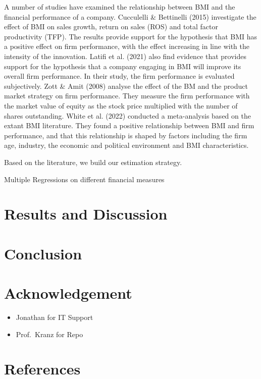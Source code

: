 \documentclass[
]{article}
\providecommand{\tightlist}{%
  \setlength{\itemsep}{0pt}\setlength{\parskip}{0pt}}\usepackage{longtable,booktabs,array}
\begin{document}
A number of studies have examined the relationship between BMI and the
financial performance of a company. Cucculelli \& Bettinelli (2015)
investigate the effect of BMI on sales growth, return on sales (ROS) and
total factor productivity (TFP). The results provide support for the
hypothesis that BMI has a positive effect on firm performance, with the
effect increasing in line with the intensity of the innovation. Latifi
et al. (2021) also find evidence that provides support for the
hypothesis that a company engaging in BMI will improve its overall firm
performance. In their study, the firm performance is evaluated
subjectively. Zott \& Amit (2008) analyse the effect of the BM and the
product market strategy on firm performance. They measure the firm
performance with the market value of equity as the stock price
multiplied with the number of shares outstanding. White et al. (2022)
conducted a meta-analysis based on the extant BMI literature. They found
a positive relationship between BMI and firm performance, and that this
relationship is shaped by factors including the firm age, industry, the
economic and political environment and BMI characteristics.

Based on the literature, we build our estimation strategy.

Multiple Regressions on different financial measures

\section{Results and Discussion}\label{results-and-discussion}

\section{Conclusion}\label{conclusion}

\section{Acknowledgement}\label{acknowledgement}

\begin{itemize}
\tightlist
\item
  Jonathan for IT Support
\item
  Prof.~Kranz for Repo
\end{itemize}

\newpage{}

\section{References}\label{references}
\end{document}

